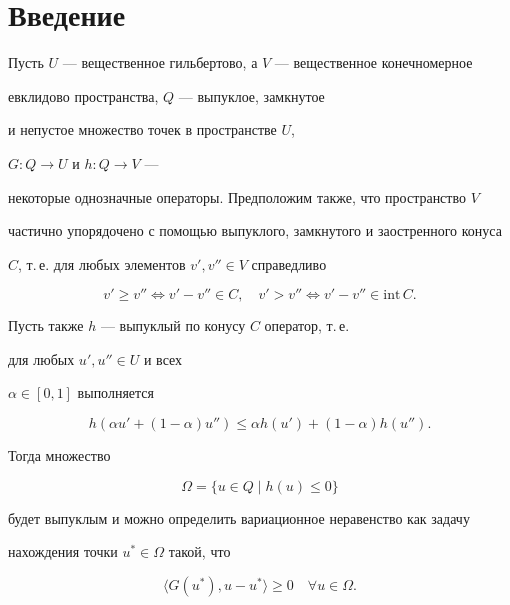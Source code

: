 \label{begin}





\section{Введение}





Пусть $U$ --- вещественное гильбертово, а $V$ --- вещественное конечномерное


евклидово пространства, $Q$ --- выпуклое, замкнутое 


и непустое множество точек в пространстве $U$,


$G: Q \rightarrow U$ и $h: Q \rightarrow V$ ---


некоторые однозначные операторы. Предположим также, что пространство $V$ 


частично упорядочено с помощью выпуклого, замкнутого и заостренного конуса


$C$, т.\,е. для любых элементов $v', v'' \in V$ справедливо


$$


v' \geq v'' \Longleftrightarrow v' - v'' \in C,


\quad v' > v'' \Longleftrightarrow v' - v'' \in \mathrm{int}\,C.


$$


Пусть также $h$ --- выпуклый по конусу $C$ оператор, т.\,е.


для любых $u', u'' \in U$ и всех


$\alpha \in [0, 1]$ выполняется


$$


h(\alpha u'+(1 - \alpha) u'') \leq \alpha h(u')+(1 - \alpha) h(u'').


$$ 


Тогда множество


\begin{equation} \label{eq:1.1} 


\Omega=\{u \in Q \mid h(u) \leq 0 \}


\end{equation}


будет выпуклым и можно определить вариационное неравенство как задачу 


нахождения точки $u^* \in \Omega $ такой, что


\begin{equation} \label{eq:1.2} 


\langle G(u^*), u - u^* \rangle \geq 0 \quad \forall u \in \Omega . 


\end{equation}


